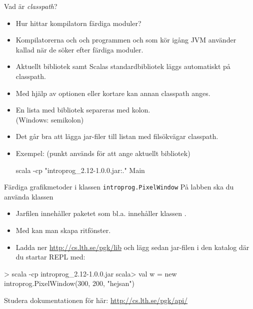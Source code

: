 \begin{Slide}{Vad är \emph{classpath}?}\SlideFontSmall
\begin{itemize}
  \item Hur hittar kompilatorn färdiga moduler?
\pause
\item Kompilatorerna  och  och programmen  och  som kör igång JVM använder  kallad  när de söker efter färdiga moduler.
\pause
\item Aktuellt bibliotek samt Scalas standardbibliotek läggs automatiskt på classpath.
\item Med hjälp av optionen  eller kortare  kan annan classpath anges.
\item En lista med bibliotek separeras med kolon.\\(Windows: semikolon)
\item Det går bra att lägga jar-filer till listan med filsökvägar classpath.
\item Exempel: (punkt används för att ange aktuellt bibliotek)
\begin{REPLnonum}
scala -cp "introprog_2.12-1.0.0.jar:." Main
\end{REPLnonum}
\end{itemize}
\end{Slide}


\begin{Slide}{Färdiga grafikmetoder i klassen \texttt{introprog.PixelWindow}}
På labben ska du använda klassen 
\begin{itemize}
\item Jarfilen  innehåller paketet  som bl.a. innehåller klassen .
\item Med  kan man skapa ritfönster.
\item Ladda ner \url{http://cs.lth.se/pgk/lib} och lägg sedan jar-filen i den katalog där du startar REPL med: 
\end{itemize}
\begin{REPLnonum}
> scala -cp introprog_2.12-1.0.0.jar
scala> val w = new introprog.PixelWindow(300, 200, "hejsan")
\end{REPLnonum}
Studera dokumentationen för  här: \url{http://cs.lth.se/pgk/api/}
\end{Slide}


